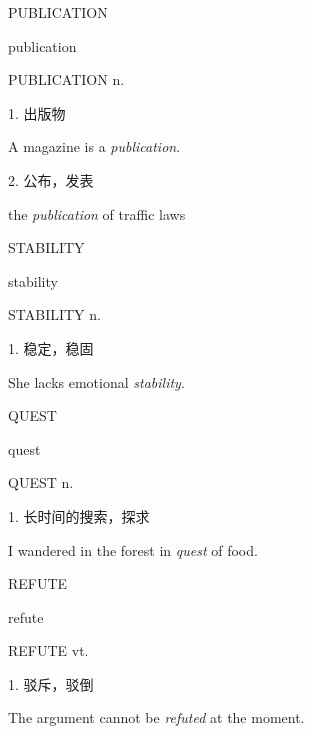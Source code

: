 \begin{flashcard}{
PUBLICATION

publication
}
\begin{center}
PUBLICATION n. 
\end{center}
1. 出版物

A magazine is a \textit{publication}.

2. 公布，发表

the \textit{publication} of traffic laws

\end{flashcard}
\begin{flashcard}{
STABILITY

stability
}
\begin{center}
STABILITY n. 
\end{center}
1. 稳定，稳固

She lacks emotional \textit{stability}.

\end{flashcard}
\begin{flashcard}{
QUEST

quest
}
\begin{center}
QUEST n. \textipa{[kwest]}
\end{center}
1. 长时间的搜索，探求

I wandered in the forest in \textit{quest} of food.

\end{flashcard}
\begin{flashcard}{
REFUTE

refute
}
\begin{center}
REFUTE vt. 
\end{center}
1. 驳斥，驳倒

The argument cannot be \textit{refuted} at the moment.

\end{flashcard}
